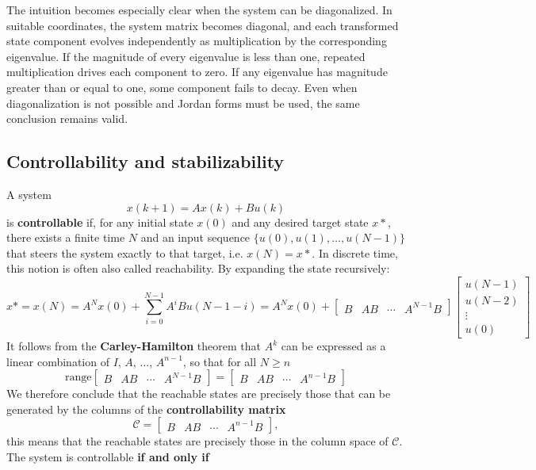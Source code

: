 The intuition becomes especially clear when the system can be diagonalized. In suitable coordinates, the system matrix becomes diagonal, and each transformed state component evolves independently as multiplication by the corresponding eigenvalue. If the magnitude of every eigenvalue is less than one, repeated multiplication drives each component to zero. If any eigenvalue has magnitude greater than or equal to one, some component fails to decay. Even when diagonalization is not possible and Jordan forms must be used, the same conclusion remains valid.

\subsection{Controllability and stabilizability}

A system
\[
x(k+1)=Ax(k)+Bu(k)
\]
is \textbf{controllable} if, for any initial state $x(0)$ and any desired target state $x*$, there exists a finite time $N$ and an input sequence $\{u(0), u(1), \dots, u(N-1)\}$ that steers the system exactly to that target, i.e. $x(N)=x*$. In discrete time, this notion is often also called reachability. By expanding the state recursively:
$$x* = x(N) = A^N x(0) + \sum_{i=0}^{N-1} A^i B u(N-1-i) = A^N x(0)+ \begin{bmatrix}
B & AB & \cdots & A^{N-1}B     
\end{bmatrix}
\begin{bmatrix}u(N-1)\\ u(N-2) \\ \vdots \\ u(0)   \end{bmatrix}$$
It follows from the \textbf{Carley-Hamilton} theorem that $A^k$ can be expressed as a linear combination of $I$, $A$, $\dots$, $A^{n-1}$, so that for all $N\ge n$ 
$$\text{range} \begin{bmatrix}
    B & AB & \cdots & A^{N-1}B
\end{bmatrix} = \begin{bmatrix}
    B & AB & \cdots & A^{n-1}B
\end{bmatrix}
$$
We therefore conclude that the reachable states are precisely those that can be generated by the columns of the \textbf{controllability matrix}
\[
\mathcal{C} = \begin{bmatrix} B & AB & \cdots & A^{n-1}B \end{bmatrix},
\]
this means that the reachable states are precisely those in the column space of $\mathcal{C}$. The system is controllable \textbf{if and only if}
